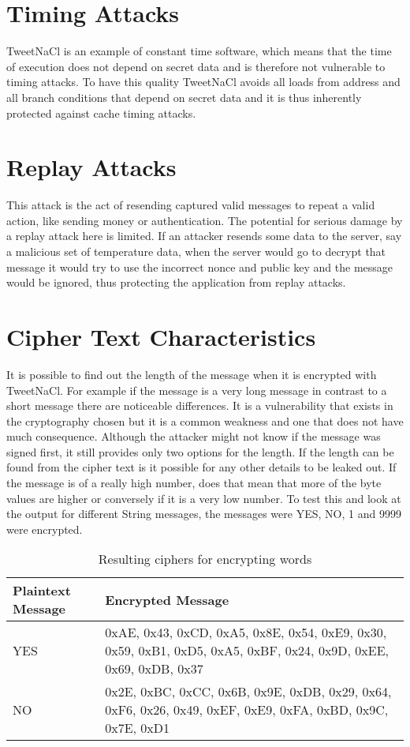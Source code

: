 \section{Timing Attacks}

TweetNaCl is an example of constant time software, which means that the time of execution does not depend on secret data and is therefore not vulnerable to timing attacks. To have this quality TweetNaCl avoids all loads from address and all branch conditions that depend on secret data and it is thus inherently protected against cache timing attacks. 

\section{Replay Attacks}

This attack is the act of resending captured valid messages to repeat a valid action, like sending money or authentication. The potential for serious damage by a replay attack here is limited. If an attacker resends some data to the server, say a malicious set of temperature data, when the server would go to decrypt that message it would try to use the incorrect nonce and public key and the message would be ignored, thus protecting the application from replay attacks.

\section{Cipher Text Characteristics}

It is possible to find out the length of the message when it is encrypted with TweetNaCl. For example if the message is a very long message in contrast to a short message there are noticeable differences. It is a vulnerability that exists in the cryptography chosen but it is a common weakness and one that does not have much consequence. Although the attacker might not know if the message was signed first, it still provides only two options for the length. If the length can be found from the cipher text is it possible for any other details to be leaked out. If the message is of a really high number, does that mean that more of the byte values are higher or conversely if it is a very low number. To test this and look at the output for different String messages, the messages were YES, NO, 1 and 9999 were encrypted. 

\begin{table}[H]
	\centering
	\begin{tabular}{ | l | p{7cm} | }
	\hline
	Plaintext Message & Encrypted Message \\ \hline
	YES & 0xAE, 0x43, 0xCD, 0xA5, 0x8E, 0x54, 0xE9,  0x30, 0x59, 0xB1, 0xD5, 0xA5, 0xBF, 0x24, 0x9D, 0xEE, 0x69, 0xDB, 0x37  \\ \hline
	NO &  0x2E, 0xBC, 0xCC, 0x6B, 0x9E, 0xDB, 0x29, 0x64, 0xF6, 0x26, 0x49, 0xEF, 0xE9, 0xFA, 0xBD, 0x9C, 0x7E, 0xD1 \\ \hline
	\end{tabular}
	\caption{Resulting ciphers for encrypting words}
	\label{tab:yesno}
\end{table}

